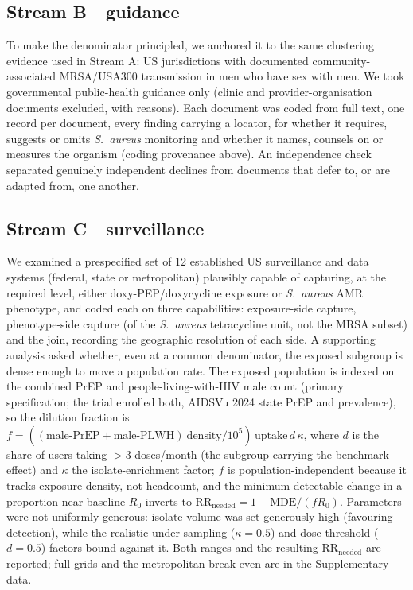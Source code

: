 \documentclass[12pt,a4paper]{article}
\newcommand{\sa}{\emph{S.~aureus}}
\begin{document}
\subsection*{Stream B---guidance}
To make the denominator principled, we anchored it to the same clustering
evidence used in Stream A: US jurisdictions with documented community-associated
MRSA/USA300 transmission in men who have sex with men.\cite{dejong2025,diep2008}
We took governmental public-health guidance only (clinic and
provider-organisation documents excluded, with reasons). Each document was coded
from full text, one record per document, every finding carrying a locator, for
whether it requires, suggests or omits \sa{} monitoring and whether it names,
counsels on or measures the organism (coding provenance above). An independence
check separated genuinely independent declines from documents that defer to, or
are adapted from, one another.

\subsection*{Stream C---surveillance}
We examined a prespecified set of 12 established US surveillance and data systems
(federal, state or metropolitan) plausibly capable of capturing, at the required
level, either doxy-PEP/doxycycline exposure or \sa{} AMR phenotype, and coded each
on three capabilities: exposure-side capture,
phenotype-side capture (of the \sa{} tetracycline unit, not the MRSA subset) and
the join, recording the geographic resolution of each side. A supporting analysis
asked whether, even at a common denominator, the exposed subgroup is dense enough
to move a population rate. The exposed population is indexed on the combined PrEP
and people-living-with-HIV male count (primary specification; the trial enrolled
both, AIDSVu 2024 state PrEP and prevalence), so the dilution fraction is
$f=((\text{male-PrEP}+\text{male-PLWH})\ \text{density}/10^{5})\,\text{uptake}\,d\,\kappa$,
where $d$ is the share of users taking $>$3 doses/month (the subgroup carrying the
benchmark effect) and $\kappa$ the isolate-enrichment factor; $f$ is
population-independent
because it tracks exposure density, not headcount, and the minimum detectable
change in a proportion near baseline $R_0$ inverts to
$\mathrm{RR_{needed}}=1+\mathrm{MDE}/(f R_0)$. Parameters were not uniformly
generous: isolate volume was set generously high (favouring detection), while the
realistic under-sampling ($\kappa=0.5$) and dose-threshold ($d=0.5$) factors bound
against it. Both ranges and the resulting $\mathrm{RR_{needed}}$ are reported;
full grids and the metropolitan break-even are in the Supplementary data.
\end{document}
